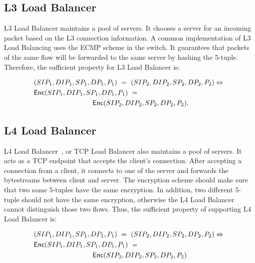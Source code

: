 \subsection{L3 Load Balancer}
L3 Load Balancer maintains a pool of servers. It chooses a server for an incoming packet based on
the L3 connection information. A common implementation of L3 Load Balancing uses the ECMP scheme in the 
switch. It guarantees that packets of the same flow will be forwarded to the same server by hashing
the 5-tuple. Therefore, the sufficient property for L3 Load Balancer is:

\begin{equation}
\label{eqn:l3lb}
\begin{split}
& (SIP_1, DIP_1, SP_1, DP_1, P_1)\ =\ (SIP_2, DIP_2, SP_2, DP_2, P_2) \Leftrightarrow \\
& \Enc(SIP_1, DIP_1, SP_1, DP_1, P_1)\ =\\
& \hspace{3cm} \Enc(SIP_2, DIP_2, SP_2, DP_2, P_2).
\end{split}
\end{equation}



\subsection{L4 Load Balancer}
L4 Load Balancer~\cite{haproxy}, or TCP Load Balancer also maintains a pool of servers.
It acts as a TCP endpoint that accepts the client's connection. After accepting a connection from a client,
it connects to one of the server and forwards the bytestreams between client and server. The encryption
scheme should make sure that two same 5-tuples have the same encryption. In addition, two different 5-tuple
should not have the same encryption, otherwise the L4 Load Balancer cannot distinguish those two flows.
Thus, the sufficient property of supporting L4 Load Balancer is:

\begin{equation}
\label{eqn:l4lb}
\begin{split}
& (SIP_1, DIP_1, SP_1, DP_1, P_1)\ =\ (SIP_2, DIP_2, SP_2, DP_2, P_2) \Leftrightarrow \\
& \Enc(SIP_1, DIP_1, SP_1, DP_1, P_1)\ = \\
& \hspace{3cm}\Enc(SIP_2, DIP_2, SP_2, DP_2, P_2)
\end{split}
\end{equation}

